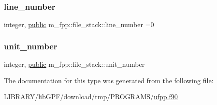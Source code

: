 \mbox{\label{structm__fpp_1_1file__stack_af76b002b417450266cb8ec6e18a540c2}} 
\subsubsection{\texorpdfstring{line\+\_\+number}{line\_number}}
{\footnotesize\ttfamily integer, \hyperlink{M__stopwatch_83_8txt_a2f74811300c361e53b430611a7d1769f}{public} m\+\_\+fpp\+::file\+\_\+stack\+::line\+\_\+number =0}

\mbox{\label{structm__fpp_1_1file__stack_ae9e32b72849f30fd750412794eb746ca}} 
\subsubsection{\texorpdfstring{unit\+\_\+number}{unit\_number}}
{\footnotesize\ttfamily integer, \hyperlink{M__stopwatch_83_8txt_a2f74811300c361e53b430611a7d1769f}{public} m\+\_\+fpp\+::file\+\_\+stack\+::unit\+\_\+number}



The documentation for this type was generated from the following file\+:\begin{DoxyCompactItemize}
\item 
L\+I\+B\+R\+A\+R\+Y/lib\+G\+P\+F/download/tmp/\+P\+R\+O\+G\+R\+A\+M\+S/\hyperlink{ufpp_8f90}{ufpp.\+f90}\end{DoxyCompactItemize}
